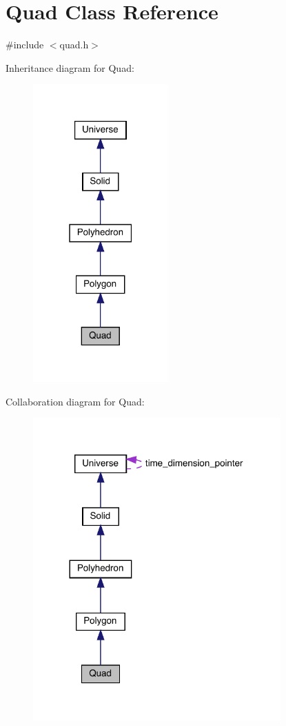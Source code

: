 \hypertarget{class_quad}{}\section{Quad Class Reference}
\label{class_quad}


{\ttfamily \#include $<$quad.\+h$>$}



Inheritance diagram for Quad\+:\nopagebreak
\begin{figure}[H]
\begin{center}
\leavevmode
\includegraphics[width=147pt]{class_quad__inherit__graph}
\end{center}
\end{figure}


Collaboration diagram for Quad\+:
\nopagebreak
\begin{figure}[H]
\begin{center}
\leavevmode
\includegraphics[width=269pt]{class_quad__coll__graph}
\end{center}
\end{figure}
